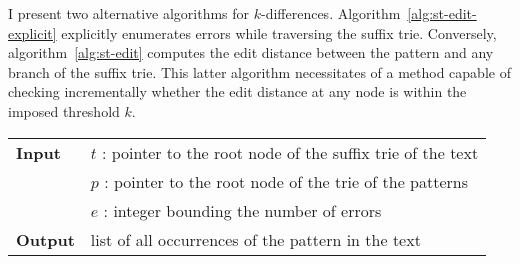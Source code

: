 I present two alternative algorithms for $k$-differences.
Algorithm~\ref{alg:st-edit-explicit} explicitly enumerates errors while traversing the suffix trie. Conversely, algorithm~\ref{alg:st-edit} computes the edit distance between the pattern and any branch of the suffix trie.
This latter algorithm necessitates of a method capable of checking incrementally whether the edit distance at any node is within the imposed threshold $k$.


\begin{center}
\begin{minipage}[t]{.8\textwidth}
\begin{algorithm}[H]
\begin{tabular}{ll}
\textbf{Input}  & $t$ : pointer to the root node of the suffix trie of the text\\
 			    & $p$ : pointer to the root node of the trie of the patterns\\
 			    & $e$ : integer bounding the number of errors\\
\textbf{Output} & list of all occurrences of the pattern in the text\\
\end{tabular}
\begin{algorithmic}[1]
	\State {}
\Else
	\State {}
	\State {}
	\State {}
		\Repeat
			\State {}
			\State {}
			\State {}
			\State {}
	\EndIf
\EndIf
\end{algorithmic}
\label{alg:st-edit-explicit}
\end{algorithm}
\end{minipage}
\end{center}


